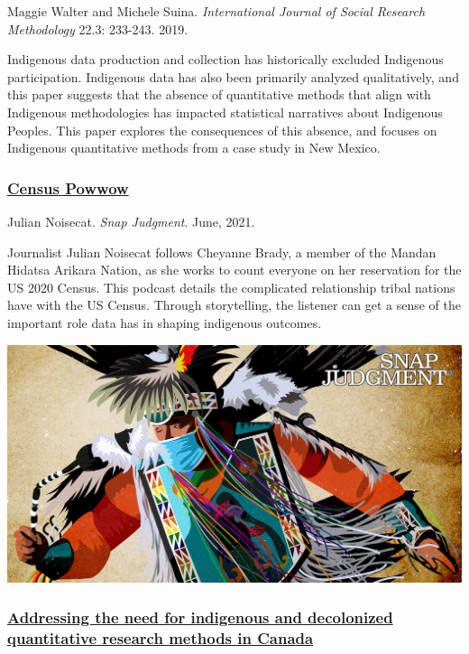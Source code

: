 \documentclass[
]{book}
\begin{document}
Maggie Walter and Michele Suina. \emph{International Journal of Social Research Methodology} 22.3: 233-243. 2019.

Indigenous data production and collection has historically excluded Indigenous participation. Indigenous data has also been primarily analyzed qualitatively, and this paper suggests that the absence of quantitative methods that align with Indigenous methodologies has impacted statistical narratives about Indigenous Peoples. This paper explores the consequences of this absence, and focuses on Indigenous quantitative methods from a case study in New Mexico.

\hypertarget{census-powwow}{%
\subsubsection*{\texorpdfstring{\href{https://open.spotify.com/episode/28040mhUkpvUtas8bd6rmE?si=e0j9BvQ5R9m3e0AGbZajSw}{Census Powwow}}{Census Powwow}}\label{census-powwow}}

Julian Noisecat. \emph{Snap Judgment}. June, 2021.

Journalist Julian Noisecat follows Cheyanne Brady, a member of the Mandan Hidatsa Arikara Nation, as she works to count everyone on her reservation for the US 2020 Census. This podcast details the complicated relationship tribal nations have with the US Census. Through storytelling, the listener can get a sense of the important role data has in shaping indigenous outcomes.

\includegraphics[width=22.22in]{images/CensusPowwow}

\hypertarget{addressing-the-need-for-indigenous-and-decolonized-quantitative-research-methods-in-canada}{%
\subsubsection*{\texorpdfstring{\href{https://www.sciencedirect.com/science/article/pii/S2352827321001749}{Addressing the need for indigenous and decolonized quantitative research methods in Canada}}{Addressing the need for indigenous and decolonized quantitative research methods in Canada}}\label{addressing-the-need-for-indigenous-and-decolonized-quantitative-research-methods-in-canada}}
\end{document}
